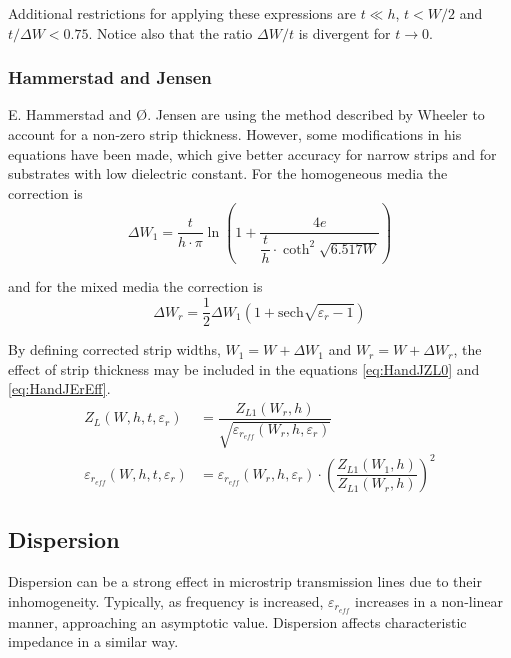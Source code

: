 \documentclass[10pt]{report}
\begin{document}
Additional restrictions for applying these expressions are $t \ll h$,
$t < W/2$ and $t/\Delta W < 0.75$.  Notice also that the ratio $\Delta
W / t$ is divergent for $t \rightarrow 0$.

\subsubsection{Hammerstad and Jensen}

E. Hammerstad and {\O}. Jensen are using the method described by Wheeler
\cite{Wheeler} to account for a non-zero strip thickness.  However,
some modifications in his equations have been made, which give better
accuracy for narrow strips and for substrates with low dielectric
constant.  For the homogeneous media the correction is
\begin{equation}
\Delta W_1 = \dfrac{t}{h\cdot\pi} \ln{\left(1 + \dfrac{4e}{\dfrac{t}{h}\cdot \coth^2{\sqrt{6.517 W}}}\right)}
\end{equation}

and for the mixed media the correction is
\begin{equation}
\Delta W_r = \dfrac{1}{2} \Delta W_1 \left(1 + \text{sech} \sqrt{\varepsilon_r - 1}\right)
\end{equation}

By defining corrected strip widths, $W_1 = W + \Delta W_1$ and $W_r =
W + \Delta W_r$, the effect of strip thickness may be included in the
equations \eqref{eq:HandJZL0} and \eqref{eq:HandJErEff}.
\begin{align}
Z_L \left(W, h, t, \varepsilon_r\right) &= \dfrac{Z_{L1} \left(W_r, h\right)}{\sqrt{\varepsilon_{r_{eff}} \left(W_r, h, \varepsilon_r\right)}}\\
\varepsilon_{r_{eff}} \left(W, h, t, \varepsilon_r\right) &= \varepsilon_{r_{eff}} \left(W_r, h, \varepsilon_r\right) \cdot \left(\dfrac{Z_{L1} \left(W_1, h\right)}{Z_{L1} \left(W_r, h\right)}\right)^2
\end{align}

\subsection{Dispersion}

Dispersion can be a strong effect in microstrip transmission lines due
to their inhomogeneity.  Typically, as frequency is increased,
$\varepsilon_{r_{eff}}$ increases in a non-linear manner, approaching
an asymptotic value.  Dispersion affects characteristic impedance in a
similar way.
\end{document}
